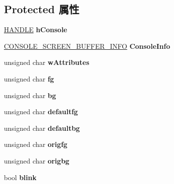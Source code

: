 \subsection*{Protected 属性}
\begin{DoxyCompactItemize}
\item 
\mbox{\label{class_t_console_a9e45e1f7a386b0e153520aaed5c536cb}} 
\hyperlink{interfacevoid}{H\+A\+N\+D\+LE} {\bfseries h\+Console}
\item 
\mbox{\label{class_t_console_a9f9de709f75077bdabcd6222220f88e6}} 
\hyperlink{structtag_c_o_n_s_o_l_e___s_c_r_e_e_n___b_u_f_f_e_r___i_n_f_o}{C\+O\+N\+S\+O\+L\+E\+\_\+\+S\+C\+R\+E\+E\+N\+\_\+\+B\+U\+F\+F\+E\+R\+\_\+\+I\+N\+FO} {\bfseries Console\+Info}
\item 
\mbox{\label{class_t_console_adfccc355ba380dd72b00645da43292a5}} 
unsigned char {\bfseries w\+Attributes}
\item 
\mbox{\label{class_t_console_a96e2cae000b30c73fb68c06f69ad2f0c}} 
unsigned char {\bfseries fg}
\item 
\mbox{\label{class_t_console_a1df55d876307fb521c056d9bf52177a0}} 
unsigned char {\bfseries bg}
\item 
\mbox{\label{class_t_console_a7d922e9f074e4648b03325c1fec1f7bb}} 
unsigned char {\bfseries defaultfg}
\item 
\mbox{\label{class_t_console_a06b7439cc7641787595e06318990b165}} 
unsigned char {\bfseries defaultbg}
\item 
\mbox{\label{class_t_console_a8b5960c5abc32fb5a3e93a1d11fb057e}} 
unsigned char {\bfseries origfg}
\item 
\mbox{\label{class_t_console_a99d8660a6ab9ab1910f4c59b82a67d32}} 
unsigned char {\bfseries origbg}
\item 
\mbox{\label{class_t_console_a536ebf06158994bd4218291884883d21}} 
bool {\bfseries blink}
\item 
\mbox{\label{class_t_console_a87f93e6b9ce899116e04eed15316b9ba}} 

\end{DoxyCompactItemize}
